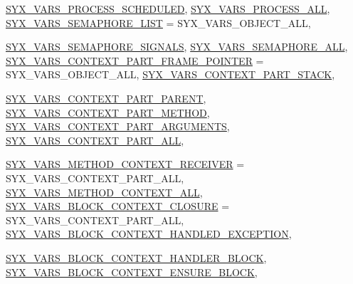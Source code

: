 \begin{CompactItemize}
\hyperlink{syx-enums_8h_c792ce905d7a570f1bf725aafa4d1d9b5026f20c8fac4fd9d9c561db90100486}{SYX\_\-VARS\_\-PROCESS\_\-SCHEDULED}, 
\hyperlink{syx-enums_8h_c792ce905d7a570f1bf725aafa4d1d9b401d0988cd12f93a1bb7f562e10baee8}{SYX\_\-VARS\_\-PROCESS\_\-ALL}, 
\hyperlink{syx-enums_8h_c792ce905d7a570f1bf725aafa4d1d9b1766e66d2eebce5ac03f9c79c25def51}{SYX\_\-VARS\_\-SEMAPHORE\_\-LIST} =  SYX\_\-VARS\_\-OBJECT\_\-ALL, 
\par
\hyperlink{syx-enums_8h_c792ce905d7a570f1bf725aafa4d1d9b955fd27882fab5301525b8930cbf4e35}{SYX\_\-VARS\_\-SEMAPHORE\_\-SIGNALS}, 
\hyperlink{syx-enums_8h_c792ce905d7a570f1bf725aafa4d1d9bbc4cc5838afa772ba50135cf4a424301}{SYX\_\-VARS\_\-SEMAPHORE\_\-ALL}, 
\hyperlink{syx-enums_8h_c792ce905d7a570f1bf725aafa4d1d9bc15fa61a2d393e111034a94975fedc12}{SYX\_\-VARS\_\-CONTEXT\_\-PART\_\-FRAME\_\-POINTER} =  SYX\_\-VARS\_\-OBJECT\_\-ALL, 
\hyperlink{syx-enums_8h_c792ce905d7a570f1bf725aafa4d1d9b091de7c7666fda569d2a11313fb0c98c}{SYX\_\-VARS\_\-CONTEXT\_\-PART\_\-STACK}, 
\par
\hyperlink{syx-enums_8h_c792ce905d7a570f1bf725aafa4d1d9b0b32e421478bf637db467828f25c419d}{SYX\_\-VARS\_\-CONTEXT\_\-PART\_\-PARENT}, 
\hyperlink{syx-enums_8h_c792ce905d7a570f1bf725aafa4d1d9b6ae478dd8536e4e2db2ac2cc26609a10}{SYX\_\-VARS\_\-CONTEXT\_\-PART\_\-METHOD}, 
\hyperlink{syx-enums_8h_c792ce905d7a570f1bf725aafa4d1d9bbfc8bb1699705fdc394fc1fefacc2486}{SYX\_\-VARS\_\-CONTEXT\_\-PART\_\-ARGUMENTS}, 
\hyperlink{syx-enums_8h_c792ce905d7a570f1bf725aafa4d1d9b333efa3f62beb879a6b32b4a70405f19}{SYX\_\-VARS\_\-CONTEXT\_\-PART\_\-ALL}, 
\par
\hyperlink{syx-enums_8h_c792ce905d7a570f1bf725aafa4d1d9b996ffa26a994947c7306e04c713eff8f}{SYX\_\-VARS\_\-METHOD\_\-CONTEXT\_\-RECEIVER} =  SYX\_\-VARS\_\-CONTEXT\_\-PART\_\-ALL, 
\hyperlink{syx-enums_8h_c792ce905d7a570f1bf725aafa4d1d9b908f6b2afce671298b6a87ce1ac7b0f3}{SYX\_\-VARS\_\-METHOD\_\-CONTEXT\_\-ALL}, 
\hyperlink{syx-enums_8h_c792ce905d7a570f1bf725aafa4d1d9b67e9c1cc0ec42502d75764ccc736b99c}{SYX\_\-VARS\_\-BLOCK\_\-CONTEXT\_\-CLOSURE} =  SYX\_\-VARS\_\-CONTEXT\_\-PART\_\-ALL, 
\hyperlink{syx-enums_8h_c792ce905d7a570f1bf725aafa4d1d9b1072781244265e90da3d5920ccbcd691}{SYX\_\-VARS\_\-BLOCK\_\-CONTEXT\_\-HANDLED\_\-EXCEPTION}, 
\par
\hyperlink{syx-enums_8h_c792ce905d7a570f1bf725aafa4d1d9b0a3cfc006d464ae520a103f3b5c2ccb0}{SYX\_\-VARS\_\-BLOCK\_\-CONTEXT\_\-HANDLER\_\-BLOCK}, 
\hyperlink{syx-enums_8h_c792ce905d7a570f1bf725aafa4d1d9b25d7f89b9c51a4673d3e9f3d7076e08b}{SYX\_\-VARS\_\-BLOCK\_\-CONTEXT\_\-ENSURE\_\-BLOCK}, 

\end{CompactItemize}
